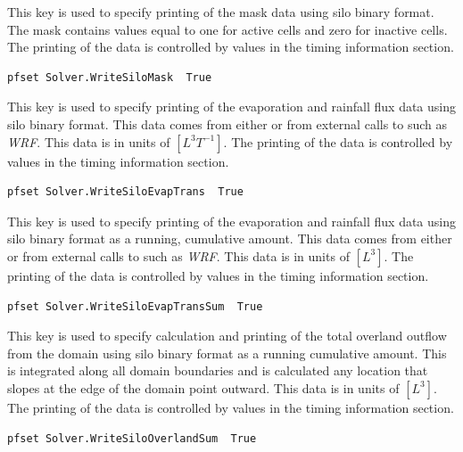 {
This key is used to specify printing of the mask data using silo binary format.  The mask contains values equal to one for active cells and zero for inactive cells.
The printing of the data is controlled by values in the
timing information section.
}
\begin{display}\begin{verbatim}
pfset Solver.WriteSiloMask  True
\end{verbatim}\end{display}

{
This key is used to specify printing of the evaporation and rainfall flux data using silo binary format.  This data comes from either  or from external calls to \parflow{} such as \emph{WRF}.  This data is in units of $[L^3 T^{-1}]$.
The printing of the data is controlled by values in the
timing information section.
}
\begin{display}\begin{verbatim}
pfset Solver.WriteSiloEvapTrans  True
\end{verbatim}\end{display}

{
This key is used to specify printing of the evaporation and rainfall flux data using silo binary format as a running, cumulative amount.  This data comes from either  or from external calls to \parflow{} such as \emph{WRF}.  This data is in units of $[L^3]$.
The printing of the data is controlled by values in the
timing information section.
}
\begin{display}\begin{verbatim}
pfset Solver.WriteSiloEvapTransSum  True
\end{verbatim}\end{display}

{
This key is used to specify calculation and printing of the total overland outflow from the domain using silo binary format as a running cumulative amount.   This is integrated along all domain boundaries and is calculated any location that slopes at the edge of the domain point outward. This data is in units of $[L^3]$.
The printing of the data is controlled by values in the
timing information section.
}
\begin{display}\begin{verbatim}
pfset Solver.WriteSiloOverlandSum  True
\end{verbatim}\end{display}

